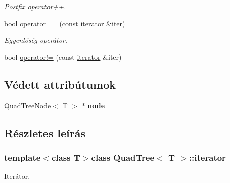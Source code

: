 \begin{DoxyCompactItemize}
\begin{DoxyCompactList}\small\item\em Postfix operator++. \end{DoxyCompactList}\item 
bool \hyperlink{class_quad_tree_1_1iterator_a73eef33266569624d3993667207d5b33}{operator==} (const \hyperlink{class_quad_tree_1_1iterator}{iterator} \&iter)
\begin{DoxyCompactList}\small\item\em Egyenlőség operátor. \end{DoxyCompactList}\item 
bool \hyperlink{class_quad_tree_1_1iterator_a145ee8bf74eee73d17bac0ab06565868}{operator!=} (const \hyperlink{class_quad_tree_1_1iterator}{iterator} \&iter)
\end{DoxyCompactItemize}
\subsection*{Védett attribútumok}
\begin{DoxyCompactItemize}
\item 
\hypertarget{class_quad_tree_1_1iterator_aab0bb24db4a4fdbc06aa20a9736e8748}{\hyperlink{class_quad_tree_node}{Quad\-Tree\-Node}$<$ T $>$ $\ast$ {\bfseries node}}\label{class_quad_tree_1_1iterator_aab0bb24db4a4fdbc06aa20a9736e8748}

\end{DoxyCompactItemize}


\subsection{Részletes leírás}
\subsubsection*{template$<$class T$>$class Quad\-Tree$<$ T $>$\-::iterator}

Iterátor. 

